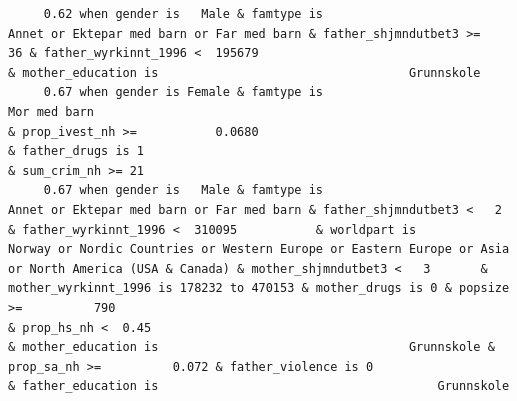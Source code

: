 \documentclass[
  letterpaper,
  DIV=11,
  numbers=noendperiod]{scrreprt}
\begin{document}
\begin{verbatim}
     0.62 when gender is   Male & famtype is                        Annet or Ektepar med barn or Far med barn & father_shjmndutbet3 >=       36 & father_wyrkinnt_1996 <  195679                                                                                                                                                                                                                                                                                                                                                                                                                                                                & mother_education is                                   Grunnskole                                                                                                                                                                     
     0.67 when gender is Female & famtype is                                                     Mor med barn                                                                                                                                                                                                                                                                                                                                                                                                                                                                                               & prop_ivest_nh >=           0.0680                                                                                                                          & father_drugs is 1                                                                        & sum_crim_nh >= 21
     0.67 when gender is   Male & famtype is                        Annet or Ektepar med barn or Far med barn & father_shjmndutbet3 <   2       & father_wyrkinnt_1996 <  310095           & worldpart is                              Norway or Nordic Countries or Western Europe or Eastern Europe or Asia or North America (USA & Canada) & mother_shjmndutbet3 <   3       & mother_wyrkinnt_1996 is 178232 to 470153 & mother_drugs is 0 & popsize >=          790                                                                    & prop_hs_nh <  0.45                                                                                & mother_education is                                   Grunnskole & prop_sa_nh >=          0.072 & father_violence is 0                     & father_education is                                       Grunnskole                    

\end{verbatim}
\end{document}
